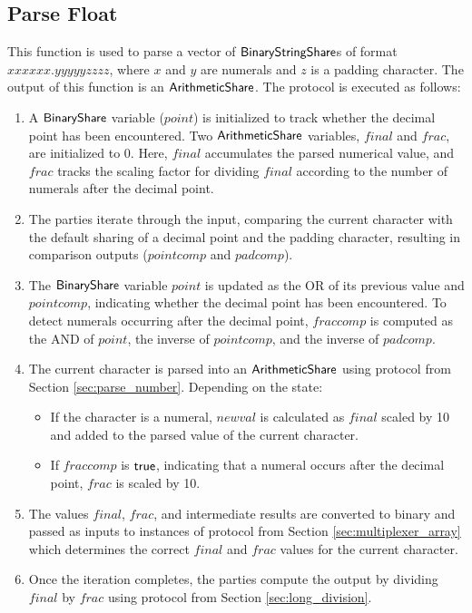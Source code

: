 \subsection{Parse Float}
\label{sec:parse_float}

This function is used to parse a vector of ${\mathsf{BinaryStringShare}}$s of format \\$xxxxxx.yyyyyzzzz$, where $x$ and $y$ are numerals and $z$ is a padding character. The output of this function is an ${\mathsf{ArithmeticShare}}$. The protocol is executed as follows:

\begin{enumerate} 
    \item A ${\mathsf{BinaryShare}}$ variable ($point$) is initialized to track whether the decimal point has been encountered. Two ${\mathsf{ArithmeticShare}}$ variables, $final$ and $frac$, are initialized to $0$. Here, $final$ accumulates the parsed numerical value, and $frac$ tracks the scaling factor for dividing $final$ according to the number of numerals after the decimal point.
    \item The parties iterate through the input, comparing the current character with the default sharing of a decimal point and the padding character, resulting in comparison outputs ($pointcomp$ and $padcomp$).
    \item The ${\mathsf{BinaryShare}}$ variable $point$ is updated as the OR of its previous value and $pointcomp$, indicating whether the decimal point has been encountered. To detect numerals occurring after the decimal point, $fraccomp$ is computed as the AND of $point$, the inverse of $pointcomp$, and the inverse of $padcomp$.
    \item The current character is parsed into an ${\mathsf{ArithmeticShare}}$ using protocol from Section \ref{sec:parse_number}. Depending on the state:
    \begin{itemize}
        \item If the character is a numeral, $newval$ is calculated as $final$ scaled by 10 and added to the parsed value of the current character.
        \item If $fraccomp$ is $\mathsf{true}$, indicating that a numeral occurs after the decimal point, $frac$ is scaled by 10.
    \end{itemize}
    \item The values $final$, $frac$, and intermediate results are converted to binary and passed as inputs to instances of protocol from Section \ref{sec:multiplexer_array} which determines the correct $final$ and $frac$ values for the current character. 
    \item Once the iteration completes, the parties compute the output by dividing $final$ by $frac$ using protocol from Section \ref{sec:long_division}.
\end{enumerate}

